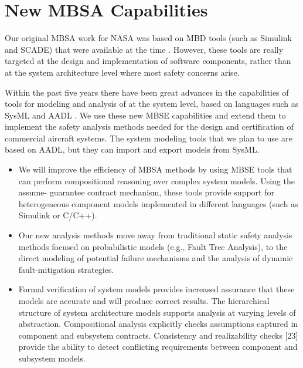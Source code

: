 \section{New MBSA Capabilities}

Our original MBSA work for NASA was based on MBD tools (such as Simulink and SCADE) that were available at the time \cite{Joshi05:Dasc}. However, these tools are really targeted at the design and implementation of software components, rather than at the system architecture level where most safety concerns arise.

Within the past five years there have been great advances in the capabilities of tools for modeling and analysis of at the system level, based on languages such as SysML \cite{SysML} and AADL \cite{AADL}. We use these new MBSE capabilities and extend them to implement the safety analysis methods needed for the design and certification of commercial aircraft systems. The system modeling tools that we plan to use are based on AADL, but they can import and export models from SysML.


\begin{itemize}
\item We will improve the efficiency of MBSA methods by using MBSE tools that can perform compositional reasoning over complex system models. Using the assume- guarantee contract mechanism, these tools provide support for heterogeneous component models implemented in different languages (such as Simulink or C/C++).

\item Our new analysis methods move away from traditional static safety analysis methods focused on probabilistic models (e.g., Fault Tree Analysis), to the direct modeling of potential failure mechanisms and the analysis of dynamic fault-mitigation strategies.

\item Formal verification of system models provides increased assurance that these models are accurate and will produce correct results. The hierarchical structure of system architecture models supports analysis at varying levels of abstraction. Compositional analysis explicitly checks assumptions captured in component and subsystem contracts. Consistency and realizability checks [23] provide the ability to detect conflicting requirements between component and subsystem models.
\end{itemize}

